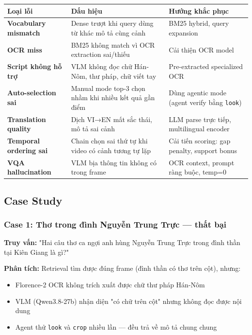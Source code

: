 \documentclass[12pt,a4paper,onecolumn]{article}
\begin{document}
\begin{center}
\begin{tabular}{l l l}
\toprule
Loại lỗi & Dấu hiệu & Hướng khắc phục \\
\midrule
\textbf{Vocabulary mismatch} & Dense trượt khi query dùng từ khác mô tả cùng cảnh & BM25 hybrid, query expansion \\
\textbf{OCR miss} & BM25 không match vì OCR extraction sai/thiếu & Cải thiện OCR model \\
\textbf{Script không hỗ trợ} & VLM không đọc chữ Hán-Nôm, thư pháp, chữ viết tay & Pre-extracted specialized OCR \\
\textbf{Auto-selection sai} & Manual mode top-3 chọn nhầm khi nhiều kết quả gần điểm & Dùng agentic mode (agent verify bằng \texttt{look}) \\
\textbf{Translation quality} & Dịch VI→EN mất sắc thái, mô tả sai cảnh & LLM parse trực tiếp, multilingual encoder \\
\textbf{Temporal ordering sai} & Chain chọn sai thứ tự khi video có cảnh tương tự lặp & Cải tiến scoring: gap penalty, support bonus \\
\textbf{VQA hallucination} & VLM bịa thông tin không có trong frame & OCR context, prompt ràng buộc, temp=0 \\
\bottomrule
\end{tabular}
\end{center}


\subsection{Case Study}

\subsubsection{Case 1: Thơ trong đình Nguyễn Trung Trực — thất bại}

\textbf{Truy vấn:} "Hai câu thơ ca ngợi anh hùng Nguyễn Trung Trực trong đình thần tại Kiên Giang là gì?"

\textbf{Phân tích:} Retrieval tìm được đúng frame (đình thần có thơ trên cột), nhưng:

\begin{itemize}
  \item Florence-2 OCR không trích xuất được chữ thư pháp Hán-Nôm
  \item VLM (Qwen3.8-27b) nhận diện "có chữ trên cột" nhưng không đọc được nội dung
  \item Agent thử \texttt{look} và \texttt{crop} nhiều lần — đều trả về mô tả chung chung
\end{itemize}
\end{document}
